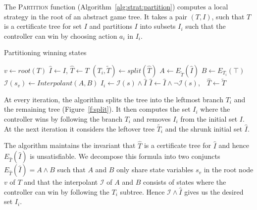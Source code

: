 The \textsc{Partition} function
(Algorithm~\ref{alg:strat:partition}) computes a local strategy in
the root of an abstract game tree.  It takes a pair $(T,I)$, such
that $T$ is a certificate tree for set $I$ and partitions $I$ into
subsets $I_i$ such that the controller can win by choosing action
$a_i$ in $I_i$.

\begin{algorithm}[t]
   \caption{Partitioning winning states}\label{alg:strat:partition}
   \begin{algorithmic}[1]
        \State $v \gets root(T)$
            \State $\hat{I} \gets I$, $\hat{T} \gets T$ 
            \State $(T_i, \tilde{T}) \gets split(\hat{T})$\label{alg:partition:split}
            \State $A \gets E_{\tilde{T}}(\hat{I}) $ \label{alg:strat:partition:Bi}
            \State $B \gets E_{T_i}(\top)$\label{alg:strat:partition:Ai}
            \State $\mathcal{I}(s_v) \gets Interpolant(A, B)$\label{alg:partition:I}
            \State $I_i \gets \mathcal{I}(s) \land \hat{I}$\label{alg:partition:Ii}
            \State $\hat{I} \gets \hat{I} \land \neg\mathcal{I}(s)$,~~$\hat{T} \gets \tilde{T}$\label{alg:partition:upd}
            \EndFor
            \State \Return{$[(T_1, I_1),\ldots, (T_j, I_j)]$} \label{alg:strat:partition:return}
        \EndFunction
    \end{algorithmic}
\end{algorithm}

At every iteration, the algorithm splits the tree into the
leftmost branch $T_i$ and the remaining tree (Figure~\ref{f:split}).
It then computes the set $I_i$ where the controller wins by following
the branch $T_i$ and removes $I_i$ from the initial set $I$.  At the
next iteration it considers the leftover tree $\tilde{T_i}$ and the
shrunk initial set $\hat{I}$.



The algorithm maintains the invariant that $\hat{T}$ is a
certificate tree for $\hat{I}$ and hence $E_{\hat{T}}(\hat{I})$ is
unsatisfiable.  We decompose this formula into two conjuncts
$E_{\hat{T}}(\hat{I}) =A \land B$ such that $A$ and $B$ only share
state variables $s_v$ in the root node $v$ of $T$ and that the
interpolant $\mathcal{I}$ of $A$ and $B$ consists of states where
the controller can win by following the $T_i$ subtree.  Hence
$\mathcal{I}\land \hat{I}$ gives us the desired set $I_i$.

